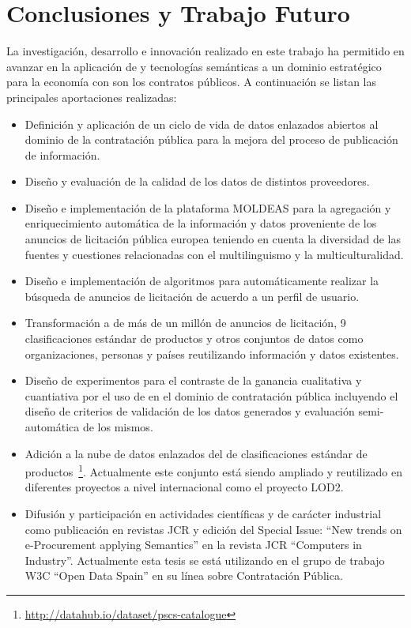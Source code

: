 \documentclass[a4paper,final,11pt,fleqn,twoside]{book}  %
\begin{document}
\chapter{Conclusiones y Trabajo Futuro}
La investigación, desarrollo e innovación realizado en este trabajo ha permitido en avanzar en la aplicación 
de \linkeddata y tecnologías semánticas a un dominio estratégico para la economía con son los contratos públicos. A 
continuación se listan las principales aportaciones realizadas:
\begin{itemize}
 \item Definición y aplicación de un ciclo de vida de datos enlazados abiertos al dominio 
 de la contratación pública para la mejora del proceso de publicación de información.
 \item Diseño y evaluación de la calidad de los datos de distintos proveedores.
 \item Diseño e implementación de la plataforma MOLDEAS para la agregación y enriquecimiento 
 automática de la información y datos proveniente de los anuncios de licitación pública europea teniendo 
 en cuenta la diversidad de las fuentes y cuestiones relacionadas con el multilinguismo y la multiculturalidad.
 \item Diseño e implementación de algoritmos para automáticamente realizar la búsqueda de anuncios 
 de licitación de acuerdo a un perfil de usuario.
\item Transformación a \linkeddata de más de un millón de anuncios de licitación, 9 clasificaciones estándar de productos 
y otros conjuntos de datos como organizaciones, personas y países reutilizando información y datos existentes.
\item Diseño de experimentos para el contraste de la ganancia cualitativa y cuantiativa por el uso de \lod en el dominio 
de contratación pública incluyendo el diseño de criterios de validación de los datos generados y evaluación semi-automática de los mismos.
\item Adición a la nube de datos enlazados del \dataset de clasificaciones estándar de productos~\footnote{\url{http://datahub.io/dataset/pscs-catalogue}}. Actualmente este conjunto
está siendo ampliado y reutilizado en diferentes proyectos a nivel internacional como el proyecto LOD2.
\item Difusión y participación en actividades científicas y de carácter industrial como publicación 
en revistas JCR y edición del Special Issue: ``New trends on e-Procurement applying Semantics'' en la revista JCR ``Computers in Industry''. 
Actualmente esta tesis se está utilizando en el grupo de trabajo W3C ``Open Data Spain'' en su línea sobre Contratación Pública.
\end{itemize}
\end{document}
